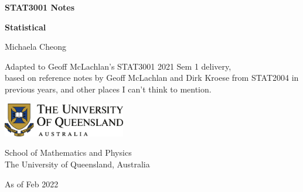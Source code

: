 \begin{titlepage}
    \begin{center}
        \vspace*{3cm}
            
        \Huge
        \textbf{STAT3001 Notes}
            
        \vspace{0.5cm}
        \LARGE
        \textbf{Statistical}
            
        \vspace{1.5cm}
            
        Michaela Cheong
            
        \vfill

        \large
        Adapted to Geoff McLachlan's STAT3001 2021 Sem 1 delivery, \\
        based on reference notes by Geoff McLachlan and Dirk Kroese from STAT2004 in previous years, and other places I can't think to mention.
            
        \vspace{0.8cm}
            
        \includegraphics[width=0.4\textwidth]{pre/uq.png}
        
        \vspace{0.5cm}

        School of Mathematics and Physics\\
        The University of Queensland, Australia\\

        \vspace{0.8cm}

        As of Feb 2022
            
    \end{center}
\end{titlepage}

\tableofcontents